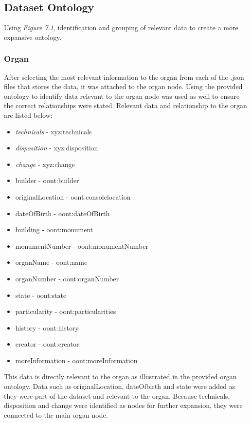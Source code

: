 \subsection{Dataset Ontology}
\hspace*{0.5cm} Using \textit{Figure 7.1}, identification and grouping of relevant data to create a more expansive ontology. 

\subsubsection{Organ}
\hspace*{0.5cm} After selecting the most relevant information to the organ from each of the .json files that stores the data, it was attached to the organ node. Using the provided ontology to identify data relevant to the organ node was used as well to ensure the correct relationships were stated. Relevant data and relationship to the organ are listed below:

\begin{itemize}
    \itemsep0em 
    \item \textit{technicals} - xyz:technicals
    \item \textit{disposition} - xyz:disposition
    \item \textit{change} - xyz:change
    \item builder - oont:builder
    \item originalLocation - oont:consolelocation
    \item dateOfBirth - oont:dateOfBirth
    \item building - oont:monument
    \item monumentNumber - oont:monumentNumber
    \item organName - oont:name
    \item organNumber - oont:organNumber 
    \item state - oont:state 
    \item particularity - oont:particularities
    \item history - oont:history
    \item creator - oont:creator
    \item moreInformation - oont:moreInformation 
\end{itemize}

This data is directly relevant to the organ as illustrated in the provided organ ontology. Data such as originalLocation, dateOfbirth and state were added as they were part of the dataset and relevant to the organ. Because technicals, disposition and change were identified as nodes for further expansion, they were connected to the main organ node. 

